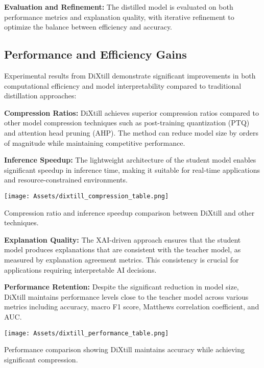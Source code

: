 \textbf{Evaluation and Refinement:} The distilled model is evaluated on both performance metrics and explanation quality, with iterative refinement to optimize the balance between efficiency and accuracy.



\subsection{Performance and Efficiency Gains}

Experimental results from DiXtill demonstrate significant improvements in both computational efficiency and model interpretability compared to traditional distillation approaches:


\textbf{Compression Ratios:} DiXtill achieves superior compression ratios compared to other model compression techniques such as post-training quantization (PTQ) and attention head pruning (AHP). The method can reduce model size by orders of magnitude while maintaining competitive performance.

\textbf{Inference Speedup:} The lightweight architecture of the student model enables significant speedup in inference time, making it suitable for real-time applications and resource-constrained environments.

\begin{table}[H]
    \centering
    \texttt{[image: Assets/dixtill\_compression\_table.png]}
    \caption{Compression ratio and inference speedup comparison between DiXtill and other techniques.}
    \label{tab:dixtill_compression}
\end{table}

\textbf{Explanation Quality:} The XAI-driven approach ensures that the student model produces explanations that are consistent with the teacher model, as measured by explanation agreement metrics. This consistency is crucial for applications requiring interpretable AI decisions.



\textbf{Performance Retention:} Despite the significant reduction in model size, DiXtill maintains performance levels close to the teacher model across various metrics including accuracy, macro F1 score, Matthews correlation coefficient, and AUC.

\begin{table}[H]
    \centering
    \texttt{[image: Assets/dixtill\_performance\_table.png]}
    \caption{Performance comparison showing DiXtill maintains accuracy while achieving significant compression.}
    \label{tab:dixtill_performance}
\end{table}


